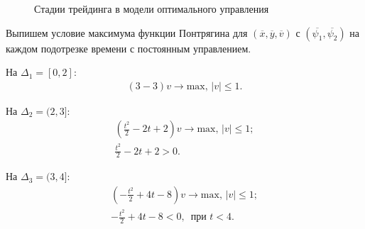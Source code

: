 \begin{figure}[h]
\centering
\caption{Стадии трейдинга в модели оптимального управления }
\end{figure}

Выпишем условие максимума функции Понтрягина для $(\overline{x}, \overline{y}, \overline{v})$ с $(\overline{\psi_1}, \overline{\psi_2})$ на каждом подотрезке времени с постоянным управлением.


На $\Delta_1 = [0, 2]$: 
\begin{gather*}
    (3 - 3) v \to \mathrm{max}, \,
    |v| \le 1.
\end{gather*}

На $\Delta_2 = (2, 3]$: 
\begin{gather*}
    (\frac{t^2}{2} - 2t + 2) v \to \mathrm{max}, \,  |v| \le 1;\\
\frac{t^2}{2} - 2t +2 > 0.
\end{gather*}

На $\Delta_3 = (3, 4]$: 
\begin{gather*}
    (-\frac{t^2}{2} + 4t - 8) v \to \mathrm{max}, \, |v| \le 1;\\
   - \frac{t^2}{2}+4t - 8 < 0, \, \textrm{ при $t<4$}.
\end{gather*}

